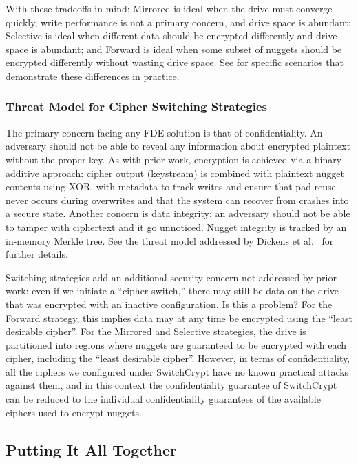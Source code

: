 With these tradeoffs in mind: Mirrored is ideal when the drive must converge
quickly, write performance is not a primary concern, and drive space is
abundant; Selective is ideal when different data should be encrypted differently
and drive space is abundant; and Forward is ideal when some subset of nuggets
should be encrypted differently without wasting drive space. See
 for specific scenarios that demonstrate these differences in
practice.

\subsubsection{Threat Model for Cipher Switching Strategies}

The primary concern facing any FDE solution is that of confidentiality. An
adversary should not be able to reveal any information about encrypted plaintext
without the proper key. As with prior work, encryption is achieved via a binary
additive approach: cipher output (keystream) is combined with plaintext nugget
contents using XOR, with metadata to track writes and ensure that pad reuse
never occurs during overwrites and that the system can recover from crashes into
a secure state. Another concern is data integrity: an adversary should not be
able to tamper with ciphertext and it go unnoticed. Nugget integrity is tracked
by an in-memory Merkle tree. See the threat model addressed by Dickens et
al.~\cite{StrongBox} for further details.

Switching strategies add an additional security concern not addressed by prior
work: even if we initiate a ``cipher switch,'' there may still be data on the
drive that was encrypted with an inactive configuration. Is this a problem? For
the Forward strategy, this implies data may at any time be encrypted using the
``least desirable cipher''. For the Mirrored and Selective strategies, the drive
is partitioned into regions where nuggets are guaranteed to be encrypted with
each cipher, including the ``least desirable cipher''. However, in terms of
confidentiality, all the ciphers we configured under SwitchCrypt have no known
practical attacks against them, and in this context the confidentiality
guarantee of SwitchCrypt can be reduced to the individual confidentiality
guarantees of the available ciphers used to encrypt nuggets. 

\subsection{Putting It All Together} \label{subsec:summary}

